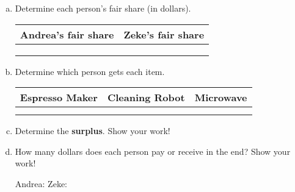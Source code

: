 \documentclass[12pt]{article}
\newcommand{\be}{\begin{enumerate}}
\newcommand{\ee}{\end{enumerate}}
\begin{document}
\be[a.]
\item Determine each person's fair share (in dollars).

\begin{tabular}{c|c}
Andrea's fair share & Zeke's fair share\\
\hline
&\\
&\\
&\\
\end{tabular}

\item  Determine which person gets each item.\\

\begin{tabular}{c|c|c}
Espresso Maker&Cleaning Robot&Microwave\\
\hline
&&\\
&&\\
\end{tabular}
\item Determine the \textbf{surplus}. Show your work!

\vfill
\item How many dollars does each person pay or receive in the end? Show your work!

Andrea:
\vfill
\vfill
Zeke:
\vfill
\vfill
\ee


\end{document}
